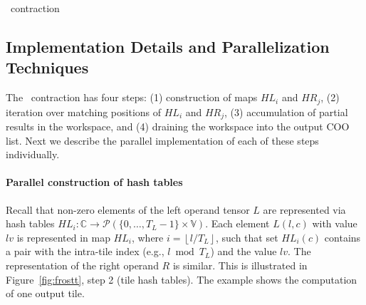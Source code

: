 \begin{algorithm}[h]
\DontPrintSemicolon
\LinesNumbered
{}
\caption{\ourtool\ contraction\label{algo:fastcc}}
\end{algorithm}


\subsection{Implementation Details and Parallelization Techniques}
The \ourtool\ contraction has four steps: (1) construction of maps $\mathit{HL}_i$ and $\mathit{HR}_j$, (2) iteration over matching positions of $\mathit{HL}_i$ and $\mathit{HR}_j$,  (3) accumulation of partial results in the workspace, and (4) draining the workspace into the output COO list. Next we describe the parallel implementation of each of these steps individually.


\paragraph{Parallel construction of hash tables} Recall that non-zero elements of the left operand tensor $L$
are represented via hash tables $\mathit{HL}_i : \mathbb{C} \rightarrow \mathcal{P}(\{ 0, \ldots, \mathit{T_L} -1\} \times \mathbb{V})$. 
Each element $L(l, c)$ with value $\mathit{lv}$ is represented in map $\mathit{HL}_i$, where $i = \left \lfloor{l/\mathit{T_L}} \right \rfloor$, such that set $\mathit{HL}_i(c)$ contains a pair with the intra-tile index (e.g., $l\bmod \mathit{T_L}$) and the value $\mathit{lv}$. The representation of the right operand $R$ is similar.
This is illustrated in Figure~\ref{fig:frostt}, step 2 (tile hash tables). The example shows the computation of one output tile.

